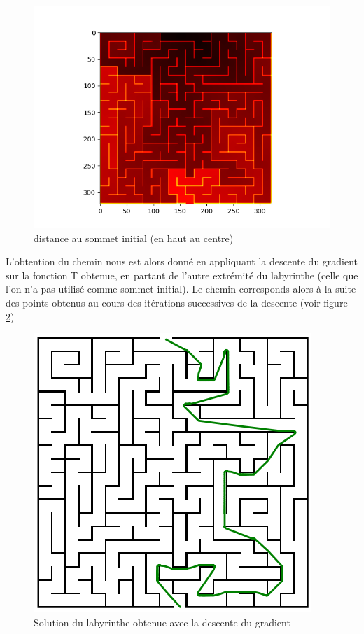 \documentclass{article}
\begin{document}
\begin{figure}[h]
	\centering
	\includegraphics[scale=0.55]{../result/maze_T.png}
	\caption{distance au sommet initial (en haut au centre)}
	\label{fig:Tfm1}
\end{figure}

L'obtention du chemin nous est alors donné en appliquant la descente du gradient sur la fonction T obtenue, en partant de l'autre extrémité du labyrinthe (celle que l'on n'a pas utilisé comme sommet initial). Le chemin corresponds alors à la suite des points obtenus au cours des itérations successives de la descente (voir figure \ref{fig:sol_fm1})

\begin{figure}[h]
	\centering
	\includegraphics[scale=0.55]{../result/geo_maze.png}
	\caption{Solution du labyrinthe obtenue avec la descente du gradient}
	\label{fig:sol_fm1}
\end{figure}
\end{document}
